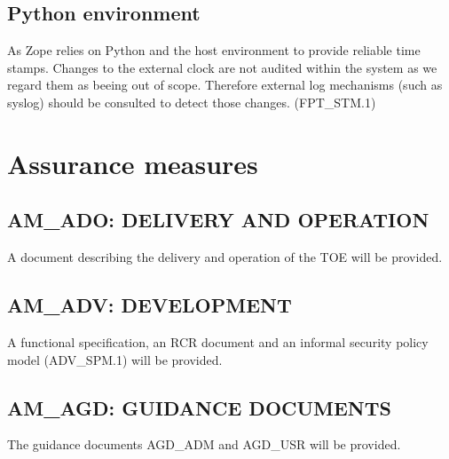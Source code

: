 \documentclass[12pt,english]{scrbook}
\begin{document}



\subsection{Python environment}

As Zope relies on Python and the host environment to provide reliable time
stamps. Changes to the external clock are not audited within the system as we
regard them as beeing out of scope.  Therefore external log mechanisms (such
as syslog) should be consulted to detect those changes. (FPT{\_}STM.1)



\section{Assurance measures}



\subsection{AM{\_}ADO: DELIVERY AND OPERATION}

A document describing the delivery and operation of the TOE will be provided.




\subsection{AM{\_}ADV: DEVELOPMENT}

A functional specification, an RCR document and an informal security policy model
(ADV\_SPM.1) will be provided.




\subsection{AM{\_}AGD: GUIDANCE DOCUMENTS}

The guidance documents AGD{\_}ADM and AGD{\_}USR will be provided.


\end{document}
